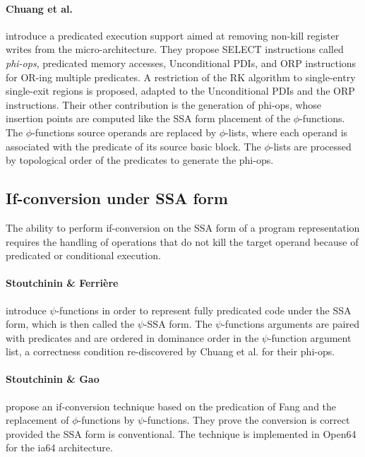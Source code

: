 \paragraph{Chuang et al. \cite{Chuang:2003:CGO}} introduce a predicated execution
support aimed at removing non-kill register writes from the micro-architecture.
They propose SELECT instructions called \emph{phi-ops}, predicated memory
accesses, Unconditional PDIs, and ORP instructions for OR-ing multiple
predicates. A restriction of the RK algorithm to single-entry single-exit
regions is proposed, adapted to the Unconditional PDIs and the ORP instructions.
Their other contribution is the generation of {phi-ops}, whose insertion points
are computed like the SSA form placement of the $\phi$-functions. The
$\phi$-functions source operands are replaced by $\phi$-lists, where each
operand is associated with the predicate of its source basic block. The
$\phi$-lists are processed by topological order of the predicates to
generate the {phi-ops}.


\subsection{If-conversion under SSA form}

The ability to perform if-conversion on the SSA form of a program representation
requires the handling of operations that do not kill the target operand because
of predicated or conditional execution.

\paragraph{Stoutchinin \& Ferri\`ere \cite{Stoutchinin:2001:MICRO}} introduce
$\psi$-functions in order to represent fully predicated code under the SSA form,
which is then called the $\psi$-SSA form.  The $\psi$-functions arguments are
paired with predicates and are ordered in dominance order in the $\psi$-function
argument list, a correctness condition re-discovered by Chuang et al.
\cite{Chuang:2003:CGO} for their phi-ops.

\paragraph{Stoutchinin \& Gao \cite{Stoutchinin:2004:EuroPar}} propose an
if-conversion technique based on the predication of Fang \cite{Fang:1996:LCPC}
and the replacement of $\phi$-functions by $\psi$-functions. They prove the
conversion is correct provided the SSA form is conventional. The technique is
implemented in Open64 for the ia64 architecture.

